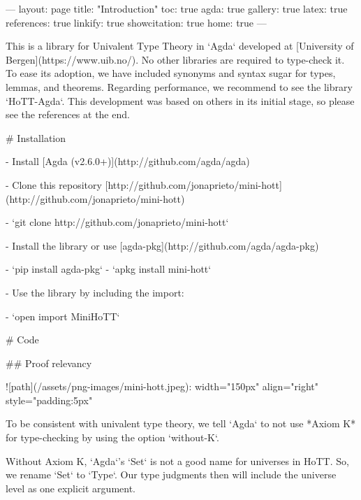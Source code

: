 ---
layout: page
title: "Introduction"
toc: true
agda: true
gallery: true
latex: true
references: true
linkify: true
showcitation: true
home: true
---

This is a library for Univalent Type Theory in `Agda` developed at [University
of Bergen](https://www.uib.no/). No other libraries are required to type-check
it. To ease its adoption, we have included synonyms and syntax sugar for types,
lemmas, and theorems. Regarding performance, we recommend to see the library
`HoTT-Agda`. This development was based on others in its initial stage, so
please see the references at the end.

# Installation

- Install [Agda (v2.6.0+)](http://github.com/agda/agda)

- Clone this repository [http://github.com/jonaprieto/mini-hott](http://github.com/jonaprieto/mini-hott)

  - `git clone http://github.com/jonaprieto/mini-hott`

- Install the library or use [agda-pkg](http://github.com/agda/agda-pkg)

  - `pip install agda-pkg`
  - `apkg install mini-hott`

- Use the library by including the import:

    - `open import MiniHoTT`

# Code

## Proof relevancy

![path](/assets/png-images/mini-hott.jpeg){: width="150px" align="right" style="padding:5px"}

To be consistent with univalent type theory, we tell `Agda` to not use *Axiom K*
for type-checking by using the option `without-K`.

\begin{code}%
\>[0]\AgdaSymbol{\{-\#}\AgdaSpace{}%
\AgdaSpace{}%
\AgdaSpace{}%
\AgdaSymbol{\#-\}}\<%
\end{code}

Without Axiom K, `Agda`'s `Set` is not a good name for universes in HoTT. So, we
rename `Set` to `Type`. Our type judgments then will include the universe level
as one explicit argument.

\begin{code}%
\>[0]\AgdaSpace{}%
\AgdaSpace{}%
\AgdaSpace{}%
\AgdaSpace{}%
\AgdaSymbol{(}\AgdaSpace{}%
\AgdaSpace{}%
\AgdaSymbol{;}\AgdaSpace{}%
\AgdaSymbol{;}\AgdaSpace{}%
\AgdaSymbol{;}\AgdaSpace{}%
\AgdaSpace{}%
\AgdaSymbol{)}\AgdaSpace{}%
\<%
\end{code}

